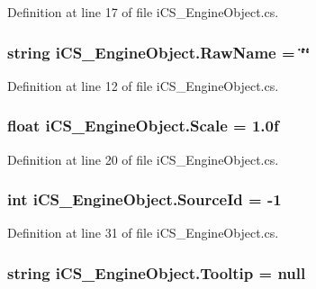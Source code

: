 Definition at line 17 of file i\+C\+S\+\_\+\+Engine\+Object.\+cs.

\hypertarget{classi_c_s___engine_object_aba59370d81e07f27900233e9f7b3fbe4}{
\subsubsection[{Raw\+Name}]{\setlength{\rightskip}{0pt plus 5cm}string i\+C\+S\+\_\+\+Engine\+Object.\+Raw\+Name = \char`\"{}\char`\"{}}}\label{classi_c_s___engine_object_aba59370d81e07f27900233e9f7b3fbe4}


Definition at line 12 of file i\+C\+S\+\_\+\+Engine\+Object.\+cs.

\hypertarget{classi_c_s___engine_object_a8bc425a9c233d8ccb8bf1df3f2859e7f}{
\subsubsection[{Scale}]{\setlength{\rightskip}{0pt plus 5cm}float i\+C\+S\+\_\+\+Engine\+Object.\+Scale = 1.\+0f}}\label{classi_c_s___engine_object_a8bc425a9c233d8ccb8bf1df3f2859e7f}


Definition at line 20 of file i\+C\+S\+\_\+\+Engine\+Object.\+cs.

\hypertarget{classi_c_s___engine_object_a5b6be51d4a4e31b16c077d2307e6ec3d}{
\subsubsection[{Source\+Id}]{\setlength{\rightskip}{0pt plus 5cm}int i\+C\+S\+\_\+\+Engine\+Object.\+Source\+Id = -\/1}}\label{classi_c_s___engine_object_a5b6be51d4a4e31b16c077d2307e6ec3d}


Definition at line 31 of file i\+C\+S\+\_\+\+Engine\+Object.\+cs.

\hypertarget{classi_c_s___engine_object_ac5b41aab69ce89ab2ded9877542f1c59}{
\subsubsection[{Tooltip}]{\setlength{\rightskip}{0pt plus 5cm}string i\+C\+S\+\_\+\+Engine\+Object.\+Tooltip = null}}\label{classi_c_s___engine_object_ac5b41aab69ce89ab2ded9877542f1c59}


